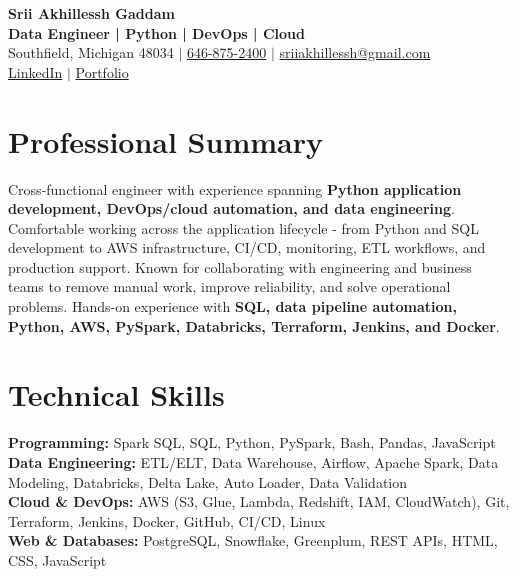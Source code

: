 \documentclass[letterpaper,10pt]{article}
\begin{document}
\fontsize{9.35pt}{10.45pt}\selectfont

\begin{center}
    {\LARGE \textbf{Srii Akhillessh Gaddam}} \\[-1pt]
    \textbf{Data Engineer | Python | DevOps | Cloud} \\[2pt]
    Southfield, Michigan 48034 $|$
    \href{tel:6468752400}{646-875-2400} $|$
    \href{mailto:sriiakhillessh@gmail.com}{sriiakhillessh@gmail.com} \\[1pt]
    \href{https://www.linkedin.com/in/srii-akhiilessh-gaddam-b48668191/}{LinkedIn} $|$
    \href{https://sriiakhillesshg.github.io/portfolio/}{Portfolio}
\end{center}
\vspace{-8pt}

\section{Professional Summary}
\small{Cross-functional engineer with experience spanning \textbf{Python application development, DevOps/cloud automation, and data engineering}. Comfortable working across the application lifecycle - from Python and SQL development to AWS infrastructure, CI/CD, monitoring, ETL workflows, and production support. Known for collaborating with engineering and business teams to remove manual work, improve reliability, and solve operational problems. Hands-on experience with \textbf{SQL, data pipeline automation, Python, AWS, PySpark, Databricks, Terraform, Jenkins, and Docker}.}

\section{Technical Skills}
\small{
\textbf{Programming:} Spark SQL, SQL, Python, PySpark, Bash, Pandas, JavaScript \\
\textbf{Data Engineering:} ETL/ELT, Data Warehouse, Airflow, Apache Spark, Data Modeling, Databricks, Delta Lake, Auto Loader, Data Validation \\
\textbf{Cloud \& DevOps:} AWS (S3, Glue, Lambda, Redshift, IAM, CloudWatch), Git, Terraform, Jenkins, Docker, GitHub, CI/CD, Linux \\
\textbf{Web \& Databases:} PostgreSQL, Snowflake, Greenplum, REST APIs, HTML, CSS, JavaScript
}
\end{document}
